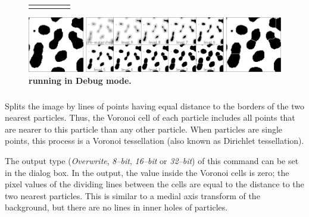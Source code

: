 \begin{figure}
\noindent \setlength{\tabcolsep}{0pt}%
\begin{tabular}{>{\centering}m{}>{\centering}m{}||>{\centering}m{}||>{\centering}m{}>{\centering}m{}}
\noindent \centering{}{\scriptsize Original} & \multicolumn{3}{>{\centering}p{0.555\columnwidth}}{\noindent \centering{}{\scriptsize Segmentation Movie }} & \noindent \centering{}{\scriptsize \nameref{sub:Watershed} result}\tabularnewline
\end{tabular}

\noindent \includegraphics[width=1\columnwidth]{images/WatershedMontage}\caption{\textsf{\protect{}}\textbf{
running in Debug mode.}}
\end{figure}



\subsubsection{\protect{}\label{sub:Voronoi}}

Splits the image
by lines of points having equal distance to the borders of the two
nearest particles. Thus, the Voronoi cell of each
particle includes all points that are nearer to this particle than
any other particle. When particles are single points, this process
is a Voronoi tessellation (also known as Dirichlet
tessellation).

The output type (\emph{Overwrite}, \emph{8--bit}, \emph{16--bit} or
\emph{32--bit}) of this command can be set in the 
dialog box. In the output, the value inside the Voronoi cells is zero;
the pixel values of the dividing lines between the cells are equal
to the distance to the two nearest particles. This is similar to a
medial axis transform of the background, but there are no lines in
inner holes of particles. 


